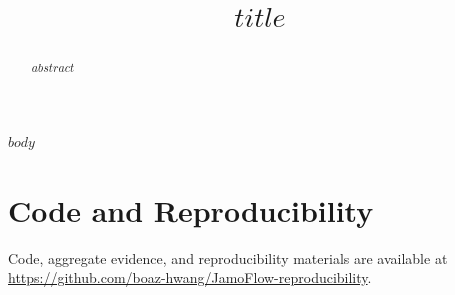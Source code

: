 \documentclass[11pt]{article}
\title{$title$}
\begin{document}
\maketitle
\begin{abstract}
$abstract$
\end{abstract}

$body$

\section*{Code and Reproducibility}
Code, aggregate evidence, and reproducibility materials are available at
\url{https://github.com/boaz-hwang/JamoFlow-reproducibility}.



\end{document}
